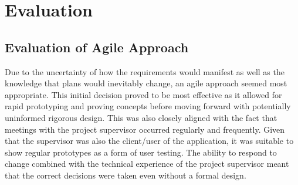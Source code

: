 \chapter{Evaluation}








\section{Evaluation of Agile Approach}

Due to the uncertainty of how the requirements would manifest as well as the knowledge that plans would inevitably change, an agile approach seemed most appropriate. This initial decision proved to be most effective as it allowed for rapid prototyping and proving concepts before moving forward with potentially uninformed rigorous design. This was also closely aligned with the fact that meetings with the project supervisor occurred regularly and frequently. Given that the supervisor was also the client/user of the application, it was suitable to show regular prototypes as a form of user testing. The ability to respond to change combined with the technical experience of the project supervisor meant that the correct decisions were taken even without a formal design.


